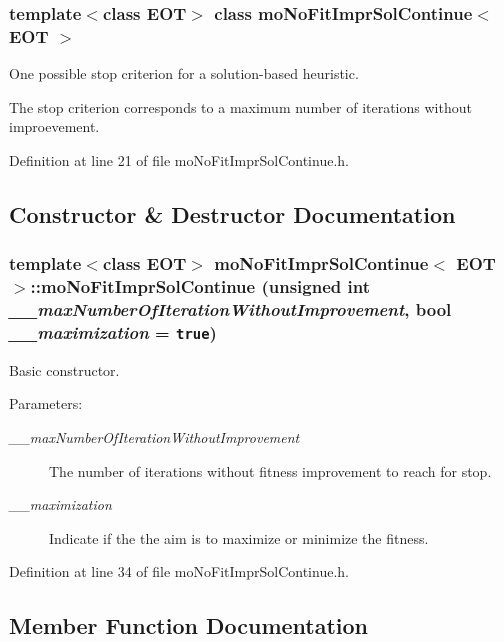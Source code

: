 \subsubsection*{template$<$class EOT$>$ class moNoFitImprSolContinue$<$ EOT $>$}

One possible stop criterion for a solution-based heuristic. 

The stop criterion corresponds to a maximum number of iterations without improevement. 



Definition at line 21 of file moNoFitImprSolContinue.h.

\subsection{Constructor \& Destructor Documentation}
\subsubsection{\setlength{\rightskip}{0pt plus 5cm}template$<$class EOT$>$ {\bf moNoFitImprSolContinue}$<$ EOT $>$::{\bf moNoFitImprSolContinue} (unsigned int {\em \_\-\_\-maxNumberOfIterationWithoutImprovement}, bool {\em \_\-\_\-maximization} = {\tt true})\hspace{0.3cm}{\tt  [inline]}}\label{classmo_no_fit_impr_sol_continue_07684d717a14a70bb94307e3ff62a826}


Basic constructor. 

\begin{Desc}
\item[Parameters:]
\begin{description}
\item[{\em \_\-\_\-maxNumberOfIterationWithoutImprovement}]The number of iterations without fitness improvement to reach for stop. \item[{\em \_\-\_\-maximization}]Indicate if the the aim is to maximize or minimize the fitness. \end{description}
\end{Desc}


Definition at line 34 of file moNoFitImprSolContinue.h.

\subsection{Member Function Documentation}
